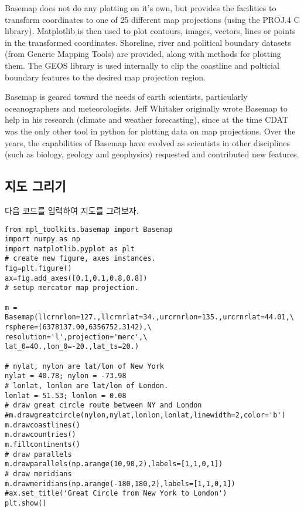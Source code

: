 Basemap does not do any plotting on it’s own, but provides the facilities to transform coordinates to one of 25 different map projections (using the PROJ.4 C library). Matplotlib is then used to plot contours, images, vectors, lines or points in the transformed coordinates. Shoreline, river and political boundary datasets (from Generic Mapping Tools) are provided, along with methods for plotting them. The GEOS library is used internally to clip the coastline and polticial boundary features to the desired map projection region.

Basemap is geared toward the needs of earth scientists, particularly oceanographers and meteorologists. Jeff Whitaker originally wrote Basemap to help in his research (climate and weather forecasting), since at the time CDAT was the only other tool in python for plotting data on map projections. Over the years, the capabilities of Basemap have evolved as scientists in other disciplines (such as biology, geology and geophysics) requested and contributed new features.


\subsection{지도 그리기}

다음 코드를 입력하여 지도를 그려보자.


\begin{code}[지도 그리기]
	\begin{lstlisting}
from mpl_toolkits.basemap import Basemap
import numpy as np
import matplotlib.pyplot as plt
# create new figure, axes instances.
fig=plt.figure()
ax=fig.add_axes([0.1,0.1,0.8,0.8])
# setup mercator map projection.

m = Basemap(llcrnrlon=127.,llcrnrlat=34.,urcrnrlon=135.,urcrnrlat=44.01,\
rsphere=(6378137.00,6356752.3142),\
resolution='l',projection='merc',\
lat_0=40.,lon_0=-20.,lat_ts=20.)

# nylat, nylon are lat/lon of New York
nylat = 40.78; nylon = -73.98
# lonlat, lonlon are lat/lon of London.
lonlat = 51.53; lonlon = 0.08
# draw great circle route between NY and London
#m.drawgreatcircle(nylon,nylat,lonlon,lonlat,linewidth=2,color='b')
m.drawcoastlines()
m.drawcountries()
m.fillcontinents()
# draw parallels
m.drawparallels(np.arange(10,90,2),labels=[1,1,0,1])
# draw meridians
m.drawmeridians(np.arange(-180,180,2),labels=[1,1,0,1])
#ax.set_title('Great Circle from New York to London')
plt.show()
		\end{lstlisting}
\end{code}